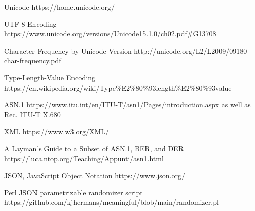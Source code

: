 \newpage
\begin{thebibliography}{12}

\setlength{\leftskip}{-5cm}

  Unicode
  https://home.unicode.org/

  UTF-8 Encoding
  https://www.unicode.org/versions/Unicode15.1.0/ch02.pdf\#G13708

  Character Frequency by Unicode Version
  http://unicode.org/L2/L2009/09180-char-frequency.pdf

  Type-Length-Value Encoding
  https://en.wikipedia.org/wiki/Type\%E2\%80\%93length\%E2\%80\%93value

  ASN.1
  https://www.itu.int/en/ITU-T/asn1/Pages/introduction.aspx
  as well as Rec. ITU-T X.680

  XML
  https://www.w3.org/XML/

  A Layman's Guide to a Subset of ASN.1, BER, and DER
  https://luca.ntop.org/Teaching/Appunti/asn1.html

  JSON, JavaScript Object Notation
  https://www.json.org/

  Perl JSON parametrizable randomizer script
  https://github.com/kjhermans/meaningful/blob/main/randomizer.pl

\setlength{\leftskip}{0cm}

\end{thebibliography}
